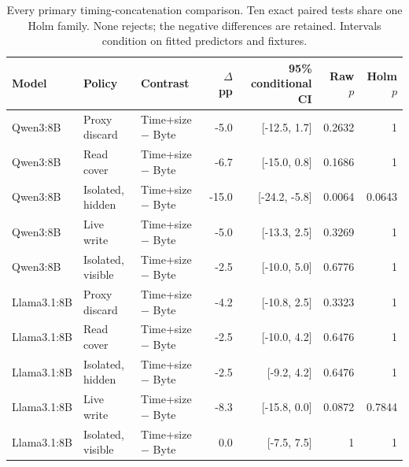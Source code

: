 \begin{table}[t]\centering\small
\caption{Every primary timing-concatenation comparison. Ten exact paired tests share one Holm family. None rejects; the negative differences are retained. Intervals condition on fitted predictors and fixtures.}\label{tab:b1-primary}
\setlength{\tabcolsep}{4pt}
\begin{tabularx}{\textwidth}{@{}lP{.12\textwidth}Yrrrr@{}}\toprule
Model & Policy & Contrast & $\Delta$ pp & 95\% conditional CI & Raw $p$ & Holm $p$ \\\midrule
Qwen3:8B & Proxy discard & Time+size $-$ Byte & -5.0 & [-12.5, 1.7] & 0.2632 & 1 \\
Qwen3:8B & Read cover & Time+size $-$ Byte & -6.7 & [-15.0, 0.8] & 0.1686 & 1 \\
Qwen3:8B & Isolated, hidden & Time+size $-$ Byte & -15.0 & [-24.2, -5.8] & 0.0064 & 0.0643 \\
Qwen3:8B & Live write & Time+size $-$ Byte & -5.0 & [-13.3, 2.5] & 0.3269 & 1 \\
Qwen3:8B & Isolated, visible & Time+size $-$ Byte & -2.5 & [-10.0, 5.0] & 0.6776 & 1 \\
Llama3.1:8B & Proxy discard & Time+size $-$ Byte & -4.2 & [-10.8, 2.5] & 0.3323 & 1 \\
Llama3.1:8B & Read cover & Time+size $-$ Byte & -2.5 & [-10.0, 4.2] & 0.6476 & 1 \\
Llama3.1:8B & Isolated, hidden & Time+size $-$ Byte & -2.5 & [-9.2, 4.2] & 0.6476 & 1 \\
Llama3.1:8B & Live write & Time+size $-$ Byte & -8.3 & [-15.8, 0.0] & 0.0872 & 0.7844 \\
Llama3.1:8B & Isolated, visible & Time+size $-$ Byte & 0.0 & [-7.5, 7.5] & 1 & 1 \\
\bottomrule\end{tabularx}\end{table}
